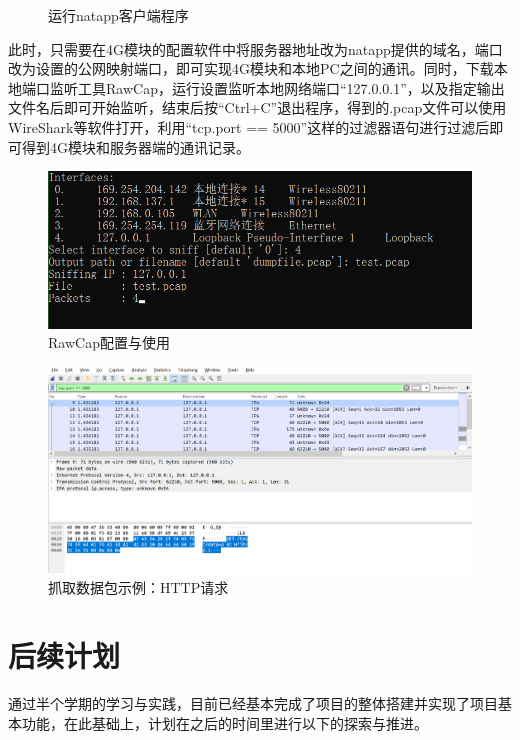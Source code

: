 \documentclass[a4paper,11pt]{ctexart}
\begin{document}
\begin{spacing}{1.5}
\begin{figure}[h]
	\caption{运行natapp客户端程序}\label{figure:隧道3}
\end{figure}
\par
此时，只需要在4G模块的配置软件中将服务器地址改为natapp提供的域名，端口改为设置的公网映射端口，即可实现4G模块和本地PC之间的通讯。同时，下载本地端口监听工具RawCap，运行设置监听本地网络端口“127.0.0.1”，以及指定输出文件名后即可开始监听，结束后按“Ctrl+C”退出程序，得到的.pcap文件可以使用WireShark等软件打开，利用“tcp.port == 5000”这样的过滤器语句进行过滤后即可得到4G模块和服务器端的通讯记录。
\begin{figure}[h]
	\centering
	\setlength{\abovecaptionskip}{2mm}
	\setlength{\belowcaptionskip}{-2mm}
	\includegraphics[scale=0.4]{隧道4.png}
	\caption{RawCap配置与使用}\label{figure:隧道4}
\end{figure}
\begin{figure}[h]
	\centering
	\setlength{\abovecaptionskip}{2mm}
	\setlength{\belowcaptionskip}{-2mm}
	\includegraphics[scale=0.2]{隧道5.png}
	\caption{抓取数据包示例：HTTP请求}\label{figure:隧道5}
\end{figure}



\section{后续计划}
\par
通过半个学期的学习与实践，目前已经基本完成了项目的整体搭建并实现了项目基本功能，在此基础上，计划在之后的时间里进行以下的探索与推进。

\end{spacing}
\end{document}
